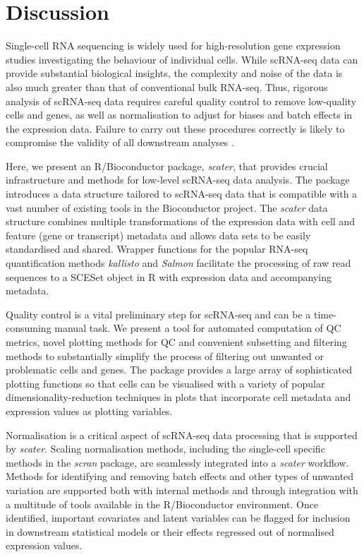 \documentclass[10pt,letterpaper]{article}
\begin{document}
\section*{Discussion}\label{discussion}

Single-cell RNA sequencing is widely used for high-resolution gene
expression studies investigating the behaviour of individual cells.
While scRNA-seq data can provide substantial biological insights, the
complexity and noise of the data is also much greater than that of
conventional bulk RNA-seq. Thus, rigorous analysis of scRNA-seq data
requires careful quality control to remove low-quality cells and genes,
as well as normalisation to adjust for biases and batch effects in the
expression data. Failure to carry out these procedures correctly is
likely to compromise the validity of all downstream analyses
\citep{Leek2010-nq,Hicks2015-qy,Grun2015-xi}.

Here, we present an R/Bioconductor package, \emph{scater}, that provides
crucial infrastructure and methods for low-level scRNA-seq data
analysis. The package introduces a data structure tailored to scRNA-seq
data that is compatible with a vast number of existing tools in the
Bioconductor project. The \emph{scater} data structure combines multiple
transformations of the expression data with cell and feature (gene or
transcript) metadata and allows data sets to be easily standardised and
shared. Wrapper functions for the popular RNA-seq quantification methods
\emph{kallisto} and \emph{Salmon} facilitate the processing of raw read
sequences to a SCESet object in R with expression data and accompanying
metadata.

Quality control is a vital preliminary step for scRNA-seq and can be a
time-consuming manual task. We present a tool for automated computation
of QC metrics, novel plotting methods for QC and convenient subsetting
and filtering methods to substantially simplify the process of filtering
out unwanted or problematic cells and genes. The package provides a
large array of sophisticated plotting functions so that cells can be
visualised with a variety of popular dimensionality-reduction techniques
in plots that incorporate cell metadata and expression values as
plotting variables.

Normalisation is a critical aspect of scRNA-seq data processing that is supported by \emph{scater}. Scaling normalisation methods, including the single-cell specific methods in the \emph{scran} package, are seamlessly integrated into a \emph{scater} workflow. Methods for identifying and removing batch effects and other types of unwanted variation are supported both with internal methods and through integration with a multitude of tools available in the R/Bioconductor environment. Once identified, important covariates and latent variables can be flagged for inclusion in downstream statistical models or their effects regressed out of normalised expression values.
\end{document}
